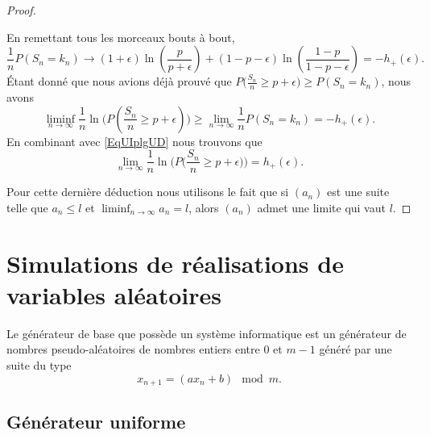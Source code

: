 \begin{proof}
\begin{enumerate}
	\end{enumerate}
	En remettant tous les morceaux bouts à bout,
	\begin{equation}
		\frac{1}{ n }P(S_n=k_n)\to (1+\epsilon)\ln\left( \frac{ p }{ p+\epsilon } \right)+(1-p-\epsilon)\ln\left( \frac{ 1-p }{ 1-p-\epsilon } \right)=-h_+(\epsilon).
	\end{equation}
	Étant donné que nous avions déjà prouvé que \( P\big( \frac{ S_n }{ n }\geq p+\epsilon \big)\geq P(S_n=k_n)\), nous avons
	\begin{equation}
		\liminf_{n\to \infty}\frac{1}{ n }\ln\Big( P(\frac{ S_n }{ n }\geq p+\epsilon) \Big)\geq \lim_{n\to \infty} \frac{1}{ n }P(S_n=k_n)=-h_+(\epsilon).
	\end{equation}
	En combinant avec \eqref{EqUIplgUD} nous trouvons que
	\begin{equation}
		\lim_{n\to \infty} \frac{1}{ n }\ln\Big( P\big( \frac{ S_n }{ n }\geq p+\epsilon \big) \Big)=h_+(\epsilon).
	\end{equation}

	Pour cette dernière déduction nous utilisons le fait que si \( (a_n)\) est une suite telle que \( a_n\leq l\) et \( \liminf_{n\to\infty}a_n=l\), alors \( (a_n)\) admet une limite qui vaut \( l\).
\end{proof}

\section{Simulations de réalisations de variables aléatoires}

Le générateur de base que possède un système informatique est un générateur de nombres pseudo-aléatoires de nombres entiers entre \( 0\) et \( m-1\) généré par une suite du type
\begin{equation}
	x_{n+1}=(ax_n+b)\mod m.
\end{equation}

\subsection{Générateur uniforme}

